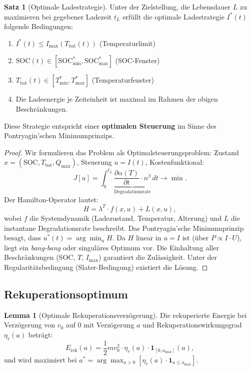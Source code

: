 ﻿\documentclass[a4paper,12pt]{article}
\theoremstyle{definition}
\newtheorem{satz}{Satz}
\newtheorem{lemma}{Lemma}
\begin{document}
\begin{satz}[Optimale Ladestrategie]
\label{satz:laden}
  Unter der Zielstellung, die Lebensdauer $L$ zu maximieren bei gegebener
  Ladezeit $t_L$ erf\"ullt die optimale Ladestrategie $I^*(t)$ folgende
  Bedingungen:
  \begin{enumerate}
    \item $I^*(t) \leq I_{\max}(T_{\mathrm{bat}}(t))$ (Temperaturlimit)
    \item $\mathrm{SOC}(t) \in [\mathrm{SOC}_{\min}^*, \mathrm{SOC}_{\max}^*]$ (SOC-Fenster)
    \item $T_{\mathrm{bat}}(t) \in [T_{\min}^*, T_{\max}^*]$ (Temperaturfenster)
    \item Die Ladeenergie je Zeiteinheit ist maximal im Rahmen der obigen Beschr\"ankungen.
  \end{enumerate}
  Diese Strategie entspricht einer \textbf{optimalen Steuerung} im Sinne des
  Pontryagin'schen Minimumprinzips.
\end{satz}

\begin{proof}
  Wir formulieren das Problem als Optimalsteuerungsproblem:
  Zustand $x = (\mathrm{SOC}, T_{\mathrm{bat}}, Q_{\max})$,
  Steuerung $u = I(t)$, Kostenfunktional:
  \[
    J[u] = \int_0^{t_L} \underbrace{\frac{\partial \alpha(T)}{\partial t} \cdot n^{\beta}}_{\text{Degradationsrate}} \, dt
    \to \min.
  \]
  Der Hamilton-Operator lautet:
  \[
    H = \lambda^T \cdot f(x, u) + L(x, u),
  \]
  wobei $f$ die Systemdynamik (Ladezustand, Temperatur, Alterung) und $L$ die
  instantane Degradationsrate beschreibt.
  Das Pontryagin'sche Minimumprinzip besagt, dass $u^*(t) = \arg\min_u H$.
  Da $H$ linear in $u = I$ ist (\"uber $P \propto I \cdot U$), liegt ein
  \emph{bang-bang} oder singul\"ares Optimum vor. Die Einhaltung aller
  Beschr\"ankungen (SOC, $T$, $I_{\max}$) garantiert die Zul\"assigkeit.
  Unter der Regularit\"atsbedingung (Slater-Bedingung) existiert die L\"osung.
\end{proof}

\subsection{Rekuperationsoptimum}

\begin{lemma}[Optimale Rekuperationsverzögerung]
\label{lem:rekup}
  Die rekuperierte Energie bei Verz\"ogerung von $v_0$ auf $0$ mit
  Verz\"ogerung $a$ und Rekuperationswirkungsgrad $\eta_r(a)$ betr\"agt:
  \[
    E_{\mathrm{rek}}(a) = \frac{1}{2} m v_0^2 \cdot \eta_r(a)
      \cdot \mathbf{1}_{[0, a_{\max}]}(a),
  \]
  und wird maximiert bei $a^* = \arg\max_{a > 0} [\eta_r(a) \cdot \mathbf{1}_{a \leq a_{\max}}]$.
\end{lemma}
\end{document}
